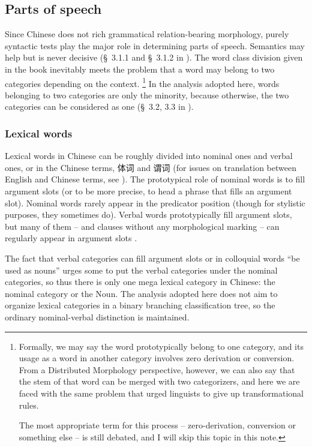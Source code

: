 \documentclass[UTF8, a4paper, oneside, scheme=plain]{ctexart}
\newcommand*{\citesec}[1]{\S~{#1}}
\begin{document}
\subsection{Parts of speech}

Since Chinese does not rich grammatical relation-bearing morphology,
purely syntactic tests play the major role in determining parts of speech.
Semantics may help but is never decisive 
(\citesec{3.1.1} and \citesec{3.1.2} in \citet{zhudexigrammar}).
The word class division given in the book inevitably meets the problem 
that a word may belong to two categories depending on the context.%
\footnote{
    Formally, we may say the word prototypically belong to one category,
    and its usage as a word in another category
    involves zero derivation or conversion.
    From a Distributed Morphology perspective,
    however, we can also say that the stem of that word can be merged with 
    two categorizers, 
    and here we are faced with the same problem that 
    urged linguists to give up transformational rules.

    The most appropriate term for this process -- 
    zero-derivation, conversion or something else -- is still debated,
    and I will skip this topic in this note.
}
In the analysis adopted here, words belonging to two categories are only the minority,
because otherwise, the two categories can be considered as one 
(\citesec{3.2, 3.3} in \citet{zhudexigrammar}).

\subsubsection{Lexical words}

Lexical words in Chinese can be roughly divided into nominal ones and verbal ones,
or in the Chinese terms, 体词 and 谓词
(for issues on translation between English and Chinese terms, see ).
The prototypical role of nominal words 
is to fill argument slots (or to be more precise, to head a phrase that fills an argument slot).
Nominal words rarely appear in the predicator position
(though for stylistic purposes, they sometimes do).
Verbal words prototypically fill argument slots,
but many of them -- and clauses without any morphological marking -- 
can regularly appear in argument slots \citep[\citesec{3.5}]{zhudexigrammar}.

The fact that verbal categories can fill argument slots or in colloquial words ``be used as nouns''
urges some to put the verbal categories under the nominal categories,
so thus there is only one mega lexical category in Chinese:
the nominal category or the Noun.
The analysis adopted here does not aim to organize lexical categories 
in a binary branching classification tree,
so the ordinary nominal-verbal distinction is maintained.
\end{document}
